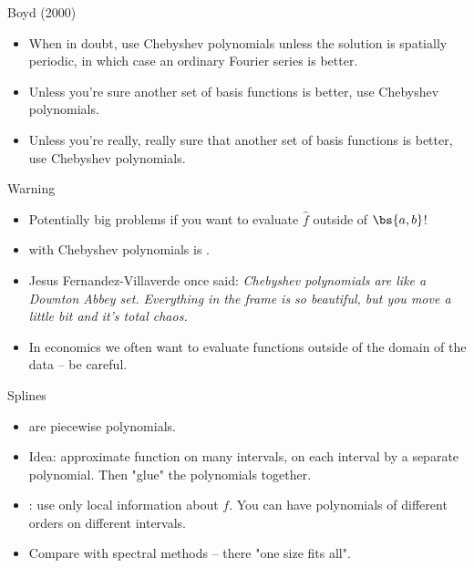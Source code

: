 \documentclass[11pt,xcolor={dvipsnames},aspectratio=159,hyperref={pdftex,pdfpagemode=UseNone,hidelinks,pdfdisplaydoctitle=true},usepdftitle=false]{beamer}
\begin{document}
\begin{frame}{Boyd (2000)}
    
    \begin{itemize} 
    \item When in doubt, use Chebyshev polynomials unless the solution is spatially periodic, in which case an ordinary Fourier series is better.
    \item Unless you're sure another set of basis functions is better, use Chebyshev polynomials.
    \item Unless you're really, really sure that another set of basis functions is better, use Chebyshev polynomials.
    \end{itemize}
\end{frame}

\begin{frame}{Warning}
    \begin{itemize}
        \item {} Potentially big problems if you want to evaluate $\hat{f}$ outside of $\bs{a,b}$!
        \item {} with Chebyshev polynomials is .
        \item Jesus Fernandez-Villaverde once said: \emph{Chebyshev polynomials are like a Downton Abbey set. Everything in the frame is so beautiful, but you move a little bit and it's total chaos.}
        \item In economics we often want to evaluate functions outside of the domain of the data -- be careful.
    \end{itemize}
\end{frame}



\begin{frame}
\end{frame}

\begin{frame}{Splines}
\begin{itemize}
    \item {} are piecewise polynomials.
    \item Idea: approximate function on many intervals, on each interval by a separate polynomial. Then "glue" the polynomials together.
    \item {}: use only local information about $f$. You can have polynomials of different orders on different intervals.
    \item Compare with spectral methods -- there "one size fits all". 
\end{itemize}
\end{frame}
\end{document}
